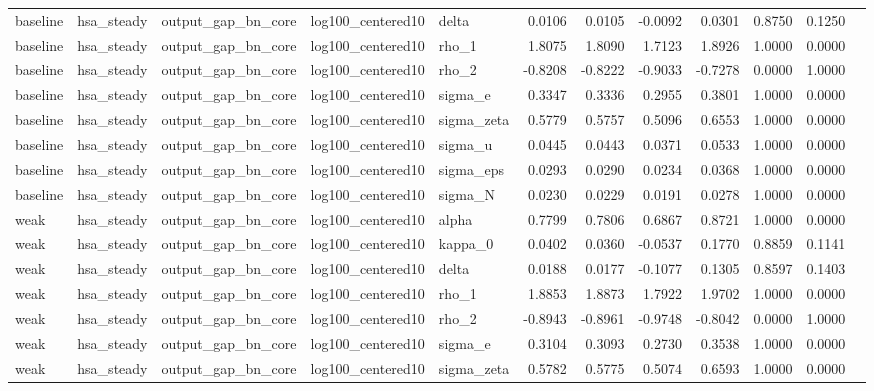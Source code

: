 \begin{tabular}{lllllrrrrrrl}
baseline & hsa\_steady & output\_gap\_bn\_core & log100\_centered10 & delta & 0.0106 & 0.0105 & -0.0092 & 0.0301 & 0.8750 & 0.1250 &  \\
baseline & hsa\_steady & output\_gap\_bn\_core & log100\_centered10 & rho\_1 & 1.8075 & 1.8090 & 1.7123 & 1.8926 & 1.0000 & 0.0000 &  \\
baseline & hsa\_steady & output\_gap\_bn\_core & log100\_centered10 & rho\_2 & -0.8208 & -0.8222 & -0.9033 & -0.7278 & 0.0000 & 1.0000 &  \\
baseline & hsa\_steady & output\_gap\_bn\_core & log100\_centered10 & sigma\_e & 0.3347 & 0.3336 & 0.2955 & 0.3801 & 1.0000 & 0.0000 &  \\
baseline & hsa\_steady & output\_gap\_bn\_core & log100\_centered10 & sigma\_zeta & 0.5779 & 0.5757 & 0.5096 & 0.6553 & 1.0000 & 0.0000 &  \\
baseline & hsa\_steady & output\_gap\_bn\_core & log100\_centered10 & sigma\_u & 0.0445 & 0.0443 & 0.0371 & 0.0533 & 1.0000 & 0.0000 &  \\
baseline & hsa\_steady & output\_gap\_bn\_core & log100\_centered10 & sigma\_eps & 0.0293 & 0.0290 & 0.0234 & 0.0368 & 1.0000 & 0.0000 &  \\
baseline & hsa\_steady & output\_gap\_bn\_core & log100\_centered10 & sigma\_N & 0.0230 & 0.0229 & 0.0191 & 0.0278 & 1.0000 & 0.0000 &  \\
weak & hsa\_steady & output\_gap\_bn\_core & log100\_centered10 & alpha & 0.7799 & 0.7806 & 0.6867 & 0.8721 & 1.0000 & 0.0000 &  \\
weak & hsa\_steady & output\_gap\_bn\_core & log100\_centered10 & kappa\_0 & 0.0402 & 0.0360 & -0.0537 & 0.1770 & 0.8859 & 0.1141 &  \\
weak & hsa\_steady & output\_gap\_bn\_core & log100\_centered10 & delta & 0.0188 & 0.0177 & -0.1077 & 0.1305 & 0.8597 & 0.1403 &  \\
weak & hsa\_steady & output\_gap\_bn\_core & log100\_centered10 & rho\_1 & 1.8853 & 1.8873 & 1.7922 & 1.9702 & 1.0000 & 0.0000 &  \\
weak & hsa\_steady & output\_gap\_bn\_core & log100\_centered10 & rho\_2 & -0.8943 & -0.8961 & -0.9748 & -0.8042 & 0.0000 & 1.0000 &  \\
weak & hsa\_steady & output\_gap\_bn\_core & log100\_centered10 & sigma\_e & 0.3104 & 0.3093 & 0.2730 & 0.3538 & 1.0000 & 0.0000 &  \\
weak & hsa\_steady & output\_gap\_bn\_core & log100\_centered10 & sigma\_zeta & 0.5782 & 0.5775 & 0.5074 & 0.6593 & 1.0000 & 0.0000 &  \\

\end{tabular}
